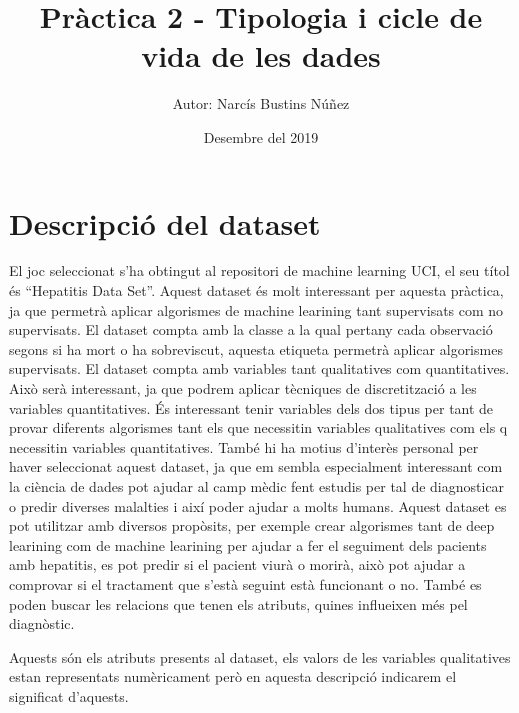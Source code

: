 \documentclass[]{article}
\title{Pràctica 2 - Tipologia i cicle de vida de les dades}
\author{Autor: Narcís Bustins Núñez}
\date{Desembre del 2019}
\begin{document}
\maketitle

{
\setcounter{tocdepth}{2}
\tableofcontents
}
\hypertarget{descripciuxf3-del-dataset}{%
\section{Descripció del dataset}\label{descripciuxf3-del-dataset}}

El joc seleccionat s'ha obtingut al repositori de machine learning UCI,
el seu títol és ``Hepatitis Data Set''. Aquest dataset és molt
interessant per aquesta pràctica, ja que permetrà aplicar algorismes de
machine learining tant supervisats com no supervisats. El dataset compta
amb la classe a la qual pertany cada observació segons si ha mort o ha
sobreviscut, aquesta etiqueta permetrà aplicar algorismes supervisats.
El dataset compta amb variables tant qualitatives com quantitatives.
Això serà interessant, ja que podrem aplicar tècniques de discretització
a les variables quantitatives. És interessant tenir variables dels dos
tipus per tant de provar diferents algorismes tant els que necessitin
variables qualitatives com els q necessitin variables quantitatives.
També hi ha motius d'interès personal per haver seleccionat aquest
dataset, ja que em sembla especialment interessant com la ciència de
dades pot ajudar al camp mèdic fent estudis per tal de diagnosticar o
predir diverses malalties i així poder ajudar a molts humans. Aquest
dataset es pot utilitzar amb diversos propòsits, per exemple crear
algorismes tant de deep learining com de machine learining per ajudar a
fer el seguiment dels pacients amb hepatitis, es pot predir si el
pacient viurà o morirà, això pot ajudar a comprovar si el tractament que
s'està seguint està funcionant o no. També es poden buscar les relacions
que tenen els atributs, quines influeixen més pel diagnòstic.

Aquests són els atributs presents al dataset, els valors de les
variables qualitatives estan representats numèricament però en aquesta
descripció indicarem el significat d'aquests.\\
\end{document}
